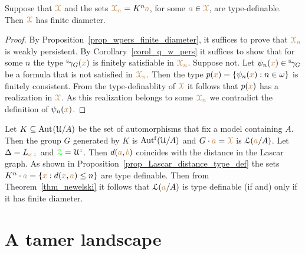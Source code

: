 \begin{theorem}\label{thm_newelski}
  Suppose that ${\color{brown}\EuScript X}$ and the sets ${\color{brown}\EuScript X_n}=K^n{\color{brown} a}$, for some ${\color{brown} a}\in{\color{brown}\EuScript X}$, are type-definable.
  Then ${\color{brown}\EuScript X}$ has finite diameter.
\end{theorem}

\begin{proof}
  By Proposition~\ref{prop_wpers_finite_diameter}, it suffices to prove that ${\color{brown}\EuScript X_n}$ is weakly persistent.
  By Corollary~\ref{corol_q_w_pers} it suffices to show that for some $n$ the type ${}^{\rm s}\kern-.2ex\gamma_G({\color{brown} x})$ is finitely satisfiable in ${\color{brown}\EuScript X_n}$.
  Suppose not.
  Let $\psi_n({\color{brown} x})\in{}^{\rm s}\kern-.2ex\gamma_G$ be a formula that is not satisfied in $\color{brown}\EuScript X_n$.
  Then the type $p({\color{brown} x})=\{\psi_n({\color{brown} x}):n\in\omega\}$ is finitely consistent.
  From the type-definablity of ${\color{brown}\EuScript X}$ it follows that $p({\color{brown} x})$ has a realization in ${\color{brown}\EuScript X}$.
  As this realization belongs to some ${\color{brown}\EuScript X_n}$ we contradict the definition of $\psi_n({\color{brown} x})$.
\end{proof}



\begin{example}\label{ex_newelski}
  Let $K\subseteq{\rm Aut\kern.15ex}(\EuScript U/A)$ be the set of automorphisms that fix a model containing $A$.
  Then the group $G$  generated by $K$ is $\mbox{Aut$^{\rm f}$}(\EuScript U/A)$ and $G\cdot{\color{brown}a}={\color{brown}\EuScript X}$ is $\EuScript L({\color{brown} a}/A)$.
  Let $\Delta=L_{{\color{brown} x}\,{\color{green} z}}$ and ${\color{green}\EuScript Z}=\EuScript U^{\color{green} z}$.
  Then $d({\color{brown} a},{\color{brown} b})$ coincides with the distance in the Lascar graph.
  As shown in Proposition~\ref{prop_Lascar_distance_type_def} the sets $K^n\cdot{\color{brown}a}=\{{\color{brown} x}:d({\color{brown} x},{\color{brown} a})\le n\}$ are type definable.
  Then from Theorem~\ref{thm_newelski} it follows that $\EuScript L({\color{brown} a}/A)$ is type definable (if and) only if it has finite diameter.
\end{example} 

\section{A tamer landscape}\label{tame_landscape}

